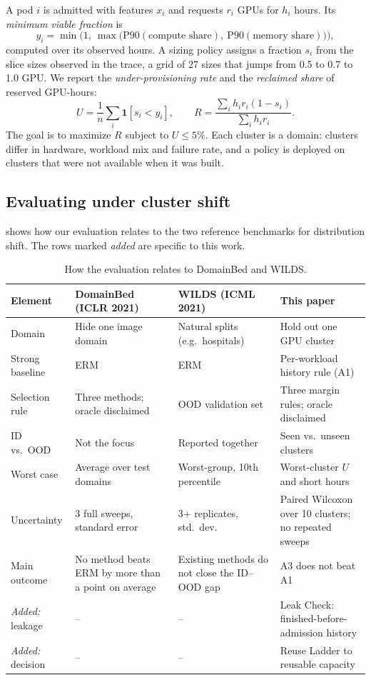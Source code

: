 \documentclass[10pt]{article}
\begin{document}
A pod $i$ is admitted with features $x_i$ and requests $r_i$ GPUs for $h_i$ hours. Its \emph{minimum viable fraction} is
\begin{equation}
y_i = \min\bigl(1,\ \max\bigl(\mathrm{P90}(\text{compute share}),\ \mathrm{P90}(\text{memory share})\bigr)\bigr),
\label{eq:mvf}
\end{equation}
computed over its observed hours. A sizing policy assigns a fraction $s_i$ from the slice sizes observed in the trace, a grid of 27 sizes that jumps from 0.5 to 0.7 to 1.0 GPU. We report the \emph{under-provisioning rate} and the \emph{reclaimed share} of reserved GPU-hours:
\begin{equation}
U = \frac{1}{n}\sum_i \mathbf{1}[s_i < y_i], \qquad R = \frac{\sum_i h_i r_i (1 - s_i)}{\sum_i h_i r_i}.
\label{eq:ur}
\end{equation}
The goal is to maximize $R$ subject to $U \le 5\%$. Each cluster is a domain: clusters differ in hardware, workload mix and failure rate, and a policy is deployed on clusters that were not available when it was built.

\subsection{Evaluating under cluster shift}
\label{sec:bg-shift}

 shows how our evaluation relates to the two reference benchmarks for distribution shift. The rows marked \emph{added} are specific to this work.

\begin{table}[t]
\centering\small
\caption{How the evaluation relates to DomainBed and WILDS.}
\label{tab:mapping}
\begin{tabularx}{\linewidth}{@{}P{2.25cm}P{3.0cm}P{3.0cm}L@{}}
\toprule
Element & DomainBed (ICLR 2021) & WILDS (ICML 2021) & This paper \\
\midrule
Domain & Hide one image domain & Natural splits (e.g.\ hospitals) & Hold out one GPU cluster \\
Strong baseline & ERM & ERM & Per-workload history rule (A1) \\
Selection rule & Three methods; oracle disclaimed & OOD validation set & Three margin rules; oracle disclaimed \\
ID vs.\ OOD & Not the focus & Reported together & Seen vs.\ unseen clusters \\
Worst case & Average over test domains & Worst-group, 10th percentile & Worst-cluster $U$ and short hours \\
Uncertainty & 3 full sweeps, standard error & 3+ replicates, std.\ dev. & Paired Wilcoxon over 10 clusters; no repeated sweeps \\
Main outcome & No method beats ERM by more than a point on average & Existing methods do not close the ID--OOD gap & A3 does not beat A1 \\
\midrule
\emph{Added:} leakage & -- & -- & Leak Check: finished-before-admission history \\
\emph{Added:} decision & -- & -- & Reuse Ladder to reusable capacity \\
\bottomrule
\end{tabularx}
\end{table}
\end{document}

